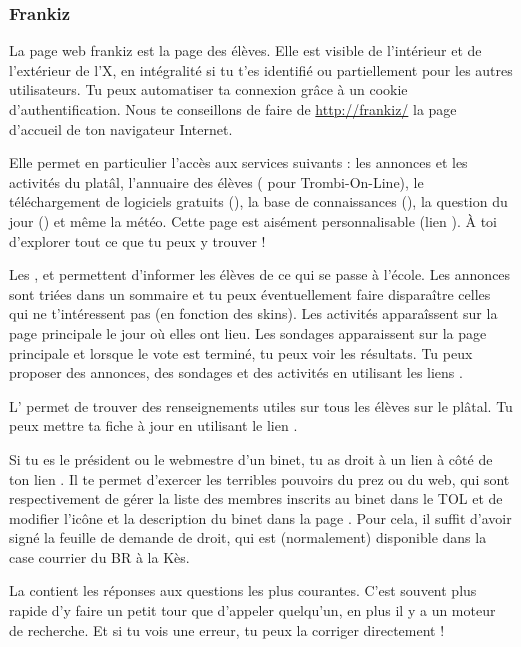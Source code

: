 \subsubsection{Frankiz}
\label{frankiz}
La page web frankiz est la page des \'el\`eves.
Elle est visible de l'int\'erieur et de l'ext\'erieur de l'X,
en int\'egralit\'e si tu t'es identifi\'e ou partiellement pour les autres utilisateurs.
Tu peux automatiser ta connexion gr\^ace \`a un cookie d'authentification.
Nous te conseillons de faire de \url{http://frankiz/} la page d'accueil de ton navigateur Internet.

Elle permet en particulier l'acc\`es aux services suivants :
les annonces et les activit\'es du plat\^al, l'annuaire des \'el\`eves ( pour Trombi-On-Line),
le t\'el\'echargement de logiciels gratuits (), la base de connaissances (),
la question du jour () et m\^eme la m\'et\'eo.
Cette page est ais\'ement personnalisable (lien ).
\`A toi d'explorer tout ce que tu peux y trouver !

Les ,  et  permettent d'informer les \'el\`eves
de ce qui se passe \`a l'\'ecole.
Les annonces sont tri\'ees dans un sommaire et tu peux \'eventuellement faire dispara\^itre
celles qui ne t'int\'eressent pas (en fonction des skins).
Les activit\'es appara\^issent sur la page principale le jour o\`u elles ont lieu.
Les sondages apparaissent sur la page principale et lorsque le vote est termin\'e, tu peux voir les r\'esultats.
Tu peux proposer des annonces, des sondages et des activit\'es en utilisant les liens .

L' permet de trouver des renseignements utiles sur tous les \'el\`eves sur le pl\^atal.
Tu peux mettre ta fiche \`a jour en utilisant le lien .

Si tu es le pr\'esident ou le webmestre d'un binet,
tu as droit \`a un lien  \`a c\^ot\'e de ton lien .
Il te permet d'exercer les terribles pouvoirs du prez ou du web,
qui sont respectivement de g\'erer la liste des membres inscrits au binet dans le TOL
et de modifier l'ic\^one et la description du binet dans la page .
Pour cela, il suffit d'avoir sign\'e la feuille de demande de droit,
qui est (normalement) disponible dans la case courrier du BR \`a la K\`es.

La  contient les r\'eponses aux questions les plus courantes.
C'est souvent plus rapide d'y faire un petit tour que d'appeler quelqu'un,
en plus il y a un moteur de recherche.
Et si tu vois une erreur, tu peux la corriger directement !

